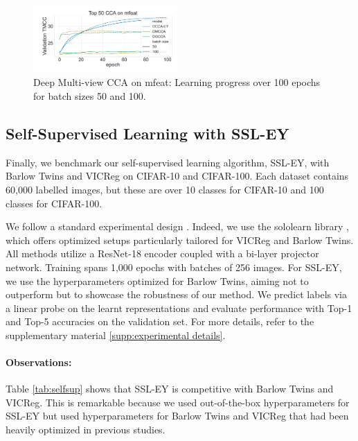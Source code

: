 \begin{figure}
    \centering
    \includegraphics[width=0.49\textwidth]{figures/DMCCA/mfeat_allbatchsizes_pcc}
    \caption{Deep Multi-view CCA on mfeat: Learning progress over 100 epochs for batch sizes 50 and 100.}\label{fig:dmcca_lr}
\end{figure}

\subsection{Self-Supervised Learning with SSL-EY}
Finally, we benchmark our self-supervised learning algorithm, SSL-EY, with Barlow Twins and VICReg on CIFAR-10 and CIFAR-100. Each dataset contains 60,000 labelled images, but these are over 10 classes for CIFAR-10 and 100 classes for CIFAR-100.

We follow a standard experimental design \citep{tong2023emp}. Indeed, we use the sololearn library \citep{da2022solo}, which offers optimized setups particularly tailored for VICReg and Barlow Twins. All methods utilize a ResNet-18 encoder coupled with a bi-layer projector network. Training spans 1,000 epochs with batches of 256 images. For SSL-EY, we use the hyperparameters optimized for Barlow Twins, aiming not to outperform but to showcase the robustness of our method.
We predict labels via a linear probe on the learnt representations and evaluate performance with Top-1 and Top-5 accuracies on the validation set. For more details, refer to the supplementary material \ref{supp:experimental details}.

\paragraph{Observations:} Table \ref{tab:selfsup} shows that SSL-EY is competitive with Barlow Twins and VICReg. This is remarkable because we used out-of-the-box hyperparameters for SSL-EY but used hyperparameters for Barlow Twins and VICReg that had been heavily optimized in previous studies.

